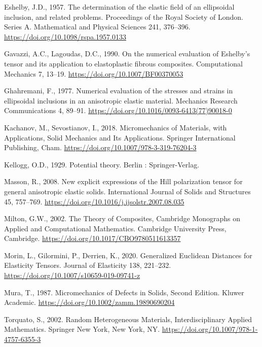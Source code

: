 \documentclass[
  a4paper,
  numbers=noendperiod,
  DIV=12]{scrreprt}
\newlength{\cslhangindent}
\newenvironment{CSLReferences}[2] %
 {\begin{list}{}{%
  \setlength{\itemindent}{0pt}
  \setlength{\leftmargin}{0pt}
  \setlength{\parsep}{0pt}
  \ifodd #1
   \setlength{\leftmargin}{\cslhangindent}
   \setlength{\itemindent}{-1\cslhangindent}
  \fi
  \setlength{\itemsep}{#2\baselineskip}}}
 {\end{list}}
\begin{document}
\begin{CSLReferences}{1}{0}
Eshelby, J.D., 1957. The determination of the elastic field of an
ellipsoidal inclusion, and related problems. Proceedings of the Royal
Society of London. Series A. Mathematical and Physical Sciences 241,
376--396. \url{https://doi.org/10.1098/rspa.1957.0133}

Gavazzi, A.C., Lagoudas, D.C., 1990. On the numerical evaluation of
{Eshelby}'s tensor and its application to elastoplastic fibrous
composites. Computational Mechanics 7, 13--19.
\url{https://doi.org/10.1007/BF00370053}

Ghahremani, F., 1977. Numerical evaluation of the stresses and strains
in ellipsoidal inclusions in an anisotropic elastic material. Mechanics
Research Communications 4, 89--91.
\url{https://doi.org/10.1016/0093-6413(77)90018-0}

Kachanov, M., Sevostianov, I., 2018. Micromechanics of {Materials}, with
{Applications}, Solid {Mechanics} and {Its Applications}. Springer
International Publishing, Cham.
\url{https://doi.org/10.1007/978-3-319-76204-3}

Kellogg, O.D., 1929. Potential theory. Berlin : Springer-Verlag.

Masson, R., 2008. New explicit expressions of the {Hill} polarization
tensor for general anisotropic elastic solids. International Journal of
Solids and Structures 45, 757--769.
\url{https://doi.org/10.1016/j.ijsolstr.2007.08.035}

Milton, G.W., 2002. The {Theory} of {Composites}, Cambridge {Monographs}
on {Applied} and {Computational Mathematics}. Cambridge University
Press, Cambridge. \url{https://doi.org/10.1017/CBO9780511613357}

Morin, L., Gilormini, P., Derrien, K., 2020. Generalized {Euclidean
Distances} for {Elasticity Tensors}. Journal of Elasticity 138,
221--232. \url{https://doi.org/10.1007/s10659-019-09741-z}

Mura, T., 1987. Micromechanics of {Defects} in {Solids}, {Second
Edition}. Kluwer Academic.
\url{https://doi.org/10.1002/zamm.19890690204}

Torquato, S., 2002. Random {Heterogeneous Materials}, Interdisciplinary
{Applied Mathematics}. Springer New York, New York, NY.
\url{https://doi.org/10.1007/978-1-4757-6355-3}


\end{CSLReferences}
\end{document}
